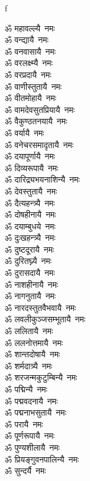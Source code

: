 f%
\begin{flushleft}
\begin{multicols}{2}
ॐ महावल्ल्यै~नमः\\
ॐ वन्द्यायै~नमः\\
ॐ वनवासायै~नमः\\
ॐ वरलक्ष्म्यै~नमः\\
ॐ वरप्रदायै~नमः\\
ॐ वाणीस्तुतायै~नमः\\
ॐ वीतमोहायै~नमः\\
ॐ वामदेवसुतप्रियायै~नमः\\
ॐ वैकुण्ठतनयायै~नमः\\
ॐ वर्यायै~नमः\hfill{}\\
ॐ वनेचरसमादृतायै~नमः\\
ॐ दयापूर्णायै~नमः\\
ॐ दिव्यरूपायै~नमः\\
ॐ दारिद्र्यभयनाशिन्यै~नमः\\
ॐ देवस्तुतायै~नमः\\
ॐ दैत्यहन्त्र्यै~नमः\\
ॐ दोषहीनायै~नमः\\
ॐ दयाम्बुधये~नमः\\
ॐ दुःखहन्त्र्यै~नमः\\
ॐ दुष्टदूरायै~नमः\hfill{}\\
ॐ दुरितघ्न्यै~नमः\\
ॐ दुरासदायै~नमः\\
ॐ नाशहीनायै~नमः\\
ॐ नागनुतायै~नमः\\
ॐ नारदस्तुतवैभवायै~नमः\\
ॐ लवलीकुञ्जसम्भूतायै~नमः\\
ॐ ललितायै~नमः\\
ॐ ललनोत्तमायै~नमः\\
ॐ शान्तदोषायै~नमः\\
ॐ शर्मदात्र्यै~नमः\hfill{}\\
ॐ शरजन्मकुटुम्बिन्यै~नमः\\
ॐ पद्मिन्यै~नमः\\
ॐ पद्मवदनायै~नमः\\
ॐ पद्मनाभसुतायै~नमः \\
ॐ परायै~नमः\\
ॐ पूर्णरूपायै~नमः\\
ॐ पुण्यशीलायै~नमः\\
ॐ प्रियङ्गुवनपालिन्यै~नमः\\
ॐ सुन्दर्यै~नमः\\

\end{multicols}
\end{flushleft}
